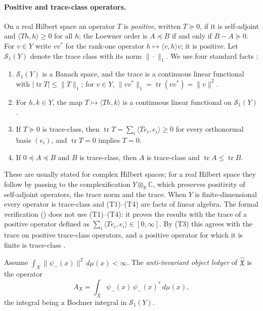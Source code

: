 \documentclass[11pt]{article}
\DeclareMathOperator{\trace}{tr}
\newcommand{\psim}{\psi_{-}}
\newcommand{\AX}{A_{X}}
\newcommand{\IOL}{\hat{\mathfrak{X}}}
\theoremstyle{definition}
\begin{document}
\paragraph{Positive and trace-class operators.}
On a real Hilbert space an operator \(T\) is \emph{positive}, written
\(T\succeq0\), if it is self-adjoint and \(\langle Th,h\rangle\geq0\)
for all \(h\); the Loewner order is \(A\preceq B\) if and only if
\(B-A\succeq0\).  For \(v\in Y\) write \(vv^*\) for the rank-one
operator \(h\mapsto\langle v,h\rangle v\); it is positive.  Let
\(\mathcal S_1(Y)\) denote the trace class with its norm
\(\|\cdot\|_1\).  We use four standard facts
\citep{Simon2005,ReedSimon1980}:
\begin{enumerate}[label=(T\arabic*)]
  \item \(\mathcal S_1(Y)\) is a Banach space, and the trace is a
    continuous linear functional with \(|\trace T|\leq\|T\|_1\); for
    \(v\in Y\), \(\|vv^*\|_1=\trace(vv^*)=\|v\|^2\).
  \item For \(h,k\in Y\), the map \(T\mapsto\langle Th,k\rangle\) is a
    continuous linear functional on \(\mathcal S_1(Y)\).
  \item If \(T\succeq0\) is trace-class, then
    \(\trace T=\sum_i\langle Te_i,e_i\rangle\geq0\) for every
    orthonormal basis \((e_i)\), and \(\trace T=0\) implies \(T=0\).
  \item If \(0\preceq A\preceq B\) and \(B\) is trace-class, then \(A\)
    is trace-class and \(\trace A\leq\trace B\).
\end{enumerate}
These are usually stated for complex Hilbert spaces; for a real
Hilbert space they follow by passing to the complexification
\(Y\otimes_{\mathbb R}\mathbb C\), which preserves positivity of
self-adjoint operators, the trace norm and the trace.  When \(Y\) is
finite-dimensional every operator is trace-class and (T1)--(T4) are
facts of linear algebra.  The formal verification
() does not use (T1)--(T4): it proves the
results with the trace of a positive operator defined as
\(\sum_i\langle Te_i,e_i\rangle\in[0,\infty]\).  By (T3) this agrees
with the trace on positive trace-class operators, and a positive
operator for which it is finite is trace-class
\citep{ReedSimon1980}.

\begin{definition}
\label{def:duality_confinement:anti-invariant-ledger}
Assume \(\int_X\|\psim(x)\|^2\,d\mu(x)<\infty\).  The
\emph{anti-invariant object ledger} of \(\IOL\) is the operator
\[
  \AX=\int_X \psim(x)\,\psim(x)^*\,d\mu(x),
\]
the integral being a Bochner integral in \(\mathcal S_1(Y)\).
\end{definition}
\end{document}
